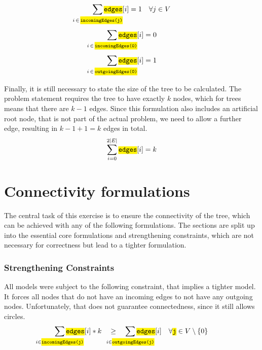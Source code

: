 \documentclass[,%
			paper=a4,%
			DIV14,
			liststotoc,
			bibtotoc,
			draft=false,%
			numbers=noendperiod
			]{scrartcl}
\newcommand{\ilc}[1]{\hl{\texttt{#1}}} %
\begin{document}
\begin{equation}\label{eq:oneIncoming}
	\sum_{\mathclap{i\,\in\,\ilc{incomingEdges(j)}}} \ilc{edges}[i] = 1 \quad \forall j \in V
\end{equation}
\begin{equation}\label{eq:root0}
	\sum_{\mathclap{i\,\in\,\ilc{incomingEdges(0)}}} \ilc{edges}[i] = 0
\end{equation}
\begin{equation}\label{eq:root1}
	\sum_{\mathclap{i\,\in\,\ilc{outgoingEdges(0)}}} \ilc{edges}[i] = 1 
\end{equation}

Finally, it is still necessary to state the size of the tree to be calculated.
The problem statement requires the tree to have exactly $k$ nodes, which for trees means that there are $k-1$ edges.
Since this formulation also includes an artificial root node, that is not part of the actual problem, we need to allow a further edge, resulting in $k-1+1=k$ edges in total.
\begin{equation}
	\sum_{i=0}^{2|E|} \ilc{edges}[i] = k
\end{equation}

\section{Connectivity formulations}

The central task of this exercise is to ensure the connectivity of the tree, which can be achieved with any of the following formulations.
The sections are split up into the essential core formulations and strengthening constraints, which are not necessary for correctness but lead to a tighter formulation.

\subsubsection{Strengthening Constraints}
All models were subject to the following constraint, that implies a tighter model. It forces all nodes that do not have an incoming edges to not have any outgoing nodes. Unfortunately, that does not guarantee connectedness, since it still allows circles.
\begin{equation}\label{eq:StrAll}
	\sum_{\mathclap{i \in \ilc{incomingEdges(j)}}} \ilc{edges}[i] * k
 \quad \geq \quad
	\sum_{\mathclap{i \in \ilc{outgoingEdges(j)}}} \ilc{edges}[i]
\quad \forall \ilc{j} \in V \setminus \{0\}
\end{equation}
\end{document}
